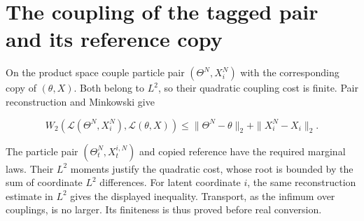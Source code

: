 \documentclass[11pt,a4paper]{article}
\begin{document}
\section{\texorpdfstring{The coupling of the tagged pair and its reference copy}{The coupling of the tagged pair and its reference copy}}


On the product space couple particle pair \((\Theta^N,X_i^N)\) with the corresponding copy of \((\theta,X)\). Both belong to \(L^2\), so their quadratic coupling cost is finite. Pair reconstruction and Minkowski give

\[W_2(\mathcal L(\Theta^N,X_i^N),\mathcal L(\theta,X))\le\|\Theta^N-\theta\|_2+\|X_i^N-X_i\|_2.\]

The particle pair \((\Theta_t^N,X_t^{i,N})\) and copied reference have the required marginal laws. Their \(L^2\) moments justify the quadratic cost, whose root is bounded by the sum of coordinate \(L^2\) differences. For latent coordinate \(i\), the same reconstruction estimate in \(L^2\) gives the displayed inequality. Transport, as the infimum over couplings, is no larger. Its finiteness is thus proved before real conversion.
\end{document}
